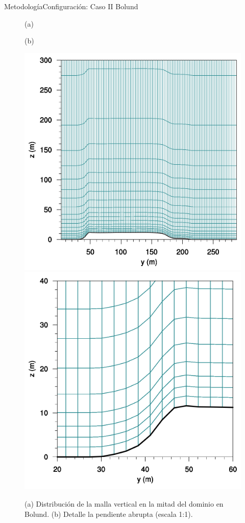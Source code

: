 \documentclass[mathserif,10pt]{beamer}
\begin{document}
\begin{frame}{Metodología}{Configuración: Caso II Bolund}
	\begin{figure}[H]
		\centering
		\begin{minipage}{0.5\linewidth}
			\center\hspace{1.2cm}(a)
		\end{minipage}%
		\begin{minipage}{0.5\linewidth}
			\center(b)
		\end{minipage}%
		
		\includegraphics[width=0.45\linewidth,trim={0cm 0cm -0cm 0cm},clip]{fig/05/mesh_y50}%
		\includegraphics[width=0.45\linewidth,trim={0cm 0cm 0cm 0cm},clip]{fig/05/hd_mesh_50}%
		
		\caption{(a) Distribución de la malla vertical en la mitad del dominio en Bolund. (b) Detalle la pendiente abrupta (escala 1:1).}
		\label{fig:05_mesh_bol}
	\end{figure}
\end{frame}
\end{document}
